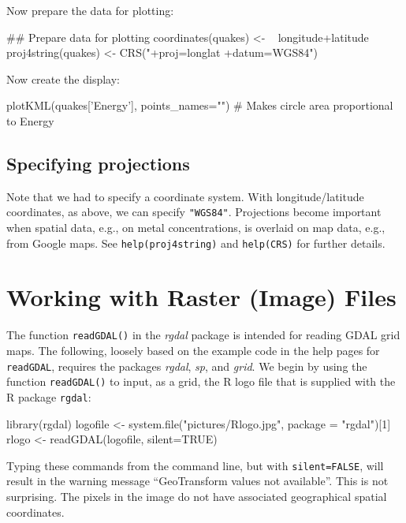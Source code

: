 \documentclass{tufte-book}\usepackage[]{graphicx}\usepackage[]{color}
\newcommand{\txtt}[1]{\texttt{#1}}
\begin{document}
Now prepare the data for plotting:
\begin{Schunk}
\begin{Sinput}
## Prepare data for plotting
coordinates(quakes) <- ~ longitude+latitude
proj4string(quakes) <-
  CRS("+proj=longlat +datum=WGS84")
\end{Sinput}
\end{Schunk}

Now create the display:
\begin{Schunk}
\begin{Sinput}
plotKML(quakes['Energy'], points_names="")
  # Makes circle area proportional to Energy
\end{Sinput}
\end{Schunk}

\subsection{Specifying projections}
Note that we had to specify a coordinate system.  With
longitude/latitude coordinates, as above, we can specify
\txtt{"WGS84"}. Projections become important when spatial data, e.g.,
on metal concentrations, is overlaid on map data, e.g., from Google
maps.  See \txtt{help(proj4string)} and \txtt{help(CRS)} for further
details.

\section{Working with Raster (Image) Files}
The function \txtt{readGDAL()} in the {\em rgdal} package is
intended for reading GDAL grid maps.
The following, loosely based on the example code in the help pages for
\txtt{readGDAL}, requires the packages {\em rgdal}, {\em sp}, and
       {\em grid}.  We begin by using the function \txtt{readGDAL()}
to input, as a grid, the R logo file that is supplied with the
R package \txtt{rgdal}:
\begin{Schunk}
\begin{Sinput}
library(rgdal)
logofile <- system.file("pictures/Rlogo.jpg",
                        package = "rgdal")[1]
rlogo <- readGDAL(logofile, silent=TRUE)
\end{Sinput}
\end{Schunk}
Typing these commands from the command line, but with
\txtt{silent=FALSE}, will result in the warning message ``GeoTransform
values not available''.  This is not surprising.  The pixels in the
image do not have associated geographical spatial coordinates.
\end{document}
